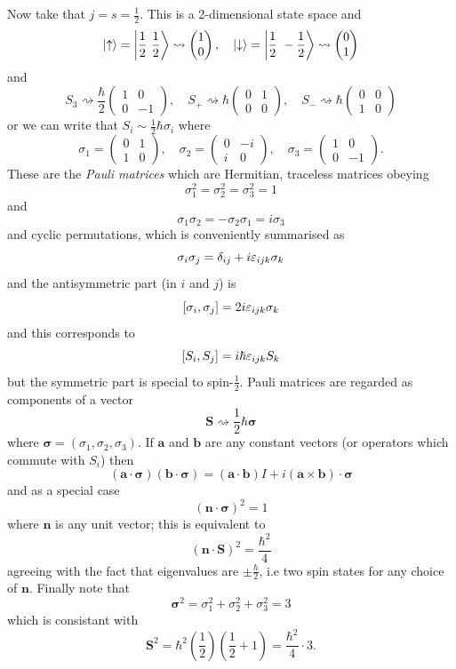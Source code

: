\documentclass{article}
\begin{document}
Now take that $ j = s= \frac 12 $. This is a 2-dimensional state space and
\[
	\ket \uparrow = \ket{ \frac 12 \ \frac 12} \rightsquigarrow \begin{pmatrix}
	  1 \\ 0
  \end{pmatrix}, \quad \ket\downarrow = \ket{\frac 12 \ - \frac 12} \rightsquigarrow \begin{pmatrix}
    0 \\ 1
  \end{pmatrix}
\]
and
\[
  S_3 \rightsquigarrow \frac \hbar 2 \begin{pmatrix}
	  1 & 0 \\
	  0 & -1
  \end{pmatrix},\quad S_+ \rightsquigarrow \hbar \begin{pmatrix}
	  0 & 1 \\
	  0 & 0
  \end{pmatrix}, \quad S_- \rightsquigarrow \hbar \begin{pmatrix}
	  0 & 0 \\
	  1 & 0
  \end{pmatrix}
\]
or we can write that $ S_i \sim \frac 12 \hbar \sigma_i $ where 
\[
  \sigma_1 = \begin{pmatrix}
     0 & 1 \\
     1 & 0
  \end{pmatrix},\quad \sigma_2 = \begin{pmatrix}
     0 & -i \\
     i & 0 
  \end{pmatrix}, \quad \sigma_3 = \begin{pmatrix}
     1 & 0 \\
     0 & -1
  \end{pmatrix}.
\]
These are the \textit{Pauli matrices} which are Hermitian, traceless matrices obeying
\[
  \sigma_1^2 = \sigma_2^2 = \sigma_3^2 = 1
\]
and
\[
  \sigma_1\sigma_2 = -\sigma_2\sigma_1 = i\sigma_3
\]
and cyclic permutations, which is conveniently summarised as
\[
	\sigma_i\sigma_j = \delta_{ij} + i \varepsilon_{ijk}\sigma_k
\]
and the antisymmetric part (in $ i $ and $ j $) is
\[
	[\sigma_i,\sigma_j] = 2i\varepsilon_{ijk}\sigma_k
\]
and this corresponds to
\[
	[S_i,S_j] = i\hbar \varepsilon_{ijk} S_k
\]
but the symmetric part is special to spin-$ \frac 12 $. Pauli matrices are regarded as components of a vector 
\[
  \mathbf S \rightsquigarrow \frac 12 \hbar \boldsymbol \sigma
\]
where $ \boldsymbol\sigma = (\sigma_1,\sigma_2,\sigma_3) $. If $ \mathbf a $ and $ \mathbf b $ are any constant vectors (or operators which commute with $ S_i $) then
\[
	(\mathbf a \cdot\boldsymbol\sigma)(\mathbf b \cdot\boldsymbol \sigma) = (\mathbf a \cdot\mathbf b) I + i(\mathbf a \times \mathbf b) \cdot \boldsymbol \sigma
\]
and as a special case
\[
	(\mathbf n \cdot\boldsymbol \sigma)^2 = 1
\]
where $ \mathbf n $ is any unit vector; this is equivalent to
\[
	(\mathbf n \cdot\mathbf S)^2 =\frac{\hbar^2}4
\]
agreeing with the fact that eigenvalues are $ \pm\frac{\hbar}2 $, i.e two spin states for any choice of $ \mathbf n $. Finally note that
\[
  \boldsymbol\sigma^2 = \sigma_1^2 +\sigma_2^2 + \sigma_3^2 = 3
\]
which is consistant with 
\[
	\mathbf S^2 = \hbar^2 \left(\frac 12\right)\left(\frac 12 + 1\right) = \frac{\hbar^2}4\cdot 3.
\]
\end{document}
